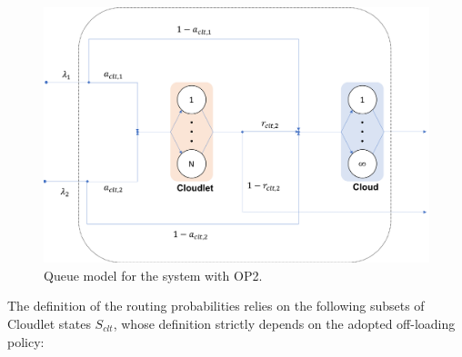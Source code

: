 \begin{figure}
	\includegraphics[width=\columnwidth]{fig/analytical-model-queue-2}
	\caption{Queue model for the system with OP2.}
	\label{fig:analytical-model-queue-2}
\end{figure}

The definition of the routing probabilities relies on the following subsets of Cloudlet states $S_{clt}$, whose definition strictly depends on the adopted off-loading policy:

